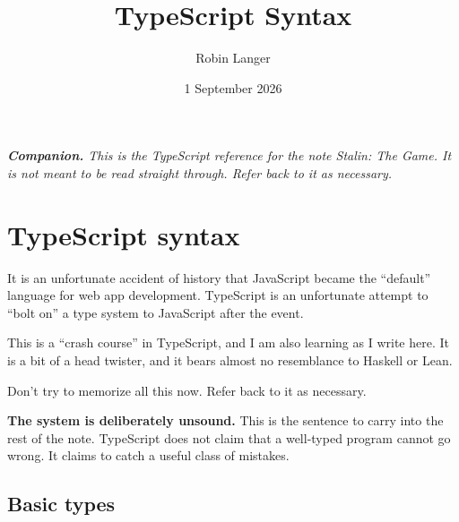 \documentclass[11pt,a4paper]{article}
\title{\vspace{-2em}TypeScript Syntax}
\author{Robin Langer}
\date{1 September 2026}
\begin{document}
\maketitle

\begin{center}
\begin{minipage}{0.88\linewidth}\small\itshape
\textbf{Companion.} This is the TypeScript reference for the note \emph{Stalin: The Game}.
It is not meant to be read straight through. Refer back to it as necessary.
\end{minipage}
\end{center}
\vspace{1mm}

\tableofcontents

\newpage

\section{TypeScript syntax}
\label{sec:ts}

\begin{sectionbox}
It is an unfortunate accident of history that JavaScript became the ``default'' language for web
app development. TypeScript is an unfortunate attempt to ``bolt on'' a type system to JavaScript
after the event.

This is a ``crash course'' in TypeScript, and I am also learning as I write here. It is a bit of a
head twister, and it bears almost no resemblance to Haskell or Lean.

Don't try to memorize all this now. Refer back to it as necessary.
\end{sectionbox}

\begin{center}
\colorbox{hdrbg}{\begin{minipage}{0.94\linewidth}\vspace{1.5mm}
\textbf{The system is deliberately unsound.} This is the sentence to carry into the rest of the
note. TypeScript does not claim that a well-typed program cannot go wrong. It claims to catch a
useful class of mistakes.
\vspace{1.5mm}\end{minipage}}
\end{center}

\subsection{Basic types}
\label{sec:tssyntax}
\end{document}
